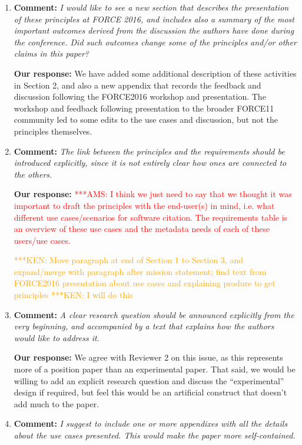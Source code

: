 \documentclass{article}
\newcommand{\niemnote}[1]{ {\textcolor{orange} { ***KEN: #1 }}} %
\newcommand{\asnote}[1]{ {\textcolor{red} { ***AMS: #1 }}} %
\begin{document}
\begin{enumerate}
\item  \textbf{Comment:}
\emph{I would like to see a new section that describes the presentation of these principles at FORCE 2016, and includes also a summary of the most important outcomes derived from the discussion the authors have done during the conference. Did such outcomes change some of the principles and/or other claims in this paper?}

\textbf{Our response:}
We have added some additional description of these activities in Section 2,
and also a new appendix that records the feedback and discussion following
the FORCE2016 workshop and presentation. The workshop and feedback following
presentation to the broader FORCE11 community led to some edits to the use
cases and discussion, but not the principles themselves.

\item \textbf{Comment:}
\emph{The link between the principles and the requirements should be introduced explicitly, since it is not entirely clear how ones are connected to the others.}

\textbf{Our response:}
\asnote{I think we just need to say that we thought it was important to draft the principles with the end-user(s) in mind, i.e. what different use cases/scenarios for software citation. The requirements table is an overview of these use cases and the metadata needs of each of these users/use cases.}

\niemnote{Move paragraph at end of Section 1 to Section 3, and expand/merge with paragraph after mission statement; find text from FORCE2016 presentation about use cases and explaining produre to get principles}
\niemnote{I will do this}


\item \textbf{Comment:}
\emph{A clear research question should be announced explicitly from the very beginning, and accompanied by a text that explains how the authors would like to address it.}

\textbf{Our response:}
We agree with Reviewer 2 on this issue, as this represents more of a position paper than an experimental paper.
That said, we would be willing to add an explicit research question and discuss the ``experimental'' design if required, but feel this would be an artificial construct that doesn't add much to the paper.


\item \textbf{Comment:}
\emph{I suggest to include one or more appendixes with all the details about the use cases presented. This would make the paper more self-contained.}


\end{enumerate}
\end{document}

